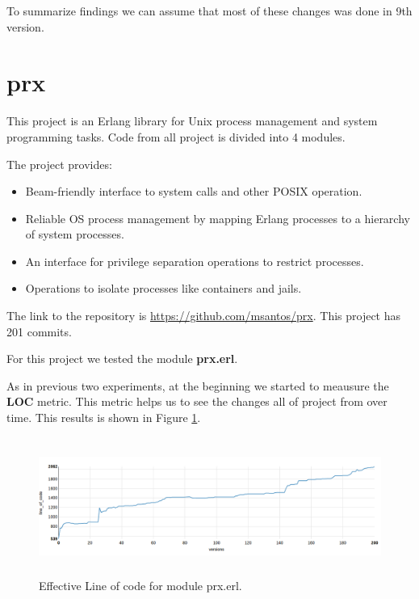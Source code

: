 To summarize findings we can assume that most of these changes was done in 9th version.


\section{prx}

This project is an Erlang library for Unix process management and system programming tasks. Code from all project is divided into 4 modules. 

The project provides:

\begin{itemize}
	\item Beam-friendly interface to system calls and other POSIX operation.
	\item Reliable OS process management by mapping Erlang processes to a hierarchy of system processes.
	\item An interface for privilege separation operations to restrict processes.
	\item Operations to isolate processes like containers and jails.
\end{itemize}


The link to the repository is \url{https://github.com/msantos/prx}. This project has 201 commits. 

For this project we tested the module \textbf{prx.erl}. 

As in previous two experiments, at the beginning we started to meausure the \textbf{LOC} metric. This metric helps us to see the changes all of project from over time. This results is shown in Figure \ref{fig:line_of_code_prx}.

\begin{figure}[h]
	\centering
	\includegraphics[height=45mm]{figures/line_of_code_prx.png}
	\caption{Effective Line of code for module prx.erl.}
	\label{fig:line_of_code_prx}
\end{figure}

